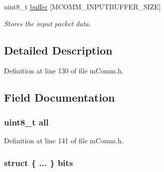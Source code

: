 \begin{DoxyCompactItemize}
\begin{tabbing}
\end{tabbing}\item 
uint8\+\_\+t \hyperlink{structm_comm___input_buffer_a8d06f288063a5615acb5cb64ecb2028d}{buffer} \mbox{[}M\+C\+O\+M\+M\+\_\+\+I\+N\+P\+U\+T\+B\+U\+F\+F\+E\+R\+\_\+\+S\+I\+Z\+E\mbox{]}
\begin{DoxyCompactList}\small\item\em Stores the input packet data. \end{DoxyCompactList}\end{DoxyCompactItemize}


\subsection{Detailed Description}


Definition at line 130 of file m\+Comm.\+h.



\subsection{Field Documentation}
\hypertarget{structm_comm___input_buffer_af61f8246015db4f0a85a942ac747131e}{}
\subsubsection[{all}]{\setlength{\rightskip}{0pt plus 5cm}uint8\+\_\+t all}\label{structm_comm___input_buffer_af61f8246015db4f0a85a942ac747131e}


Definition at line 141 of file m\+Comm.\+h.

\hypertarget{structm_comm___input_buffer_a79fd6172bbc3e268bf9c6a31aed08376}{}
\subsubsection[{bits}]{\setlength{\rightskip}{0pt plus 5cm}struct \{ ... \}   bits}\label{structm_comm___input_buffer_a79fd6172bbc3e268bf9c6a31aed08376}
\hypertarget{structm_comm___input_buffer_a8d06f288063a5615acb5cb64ecb2028d}{}
